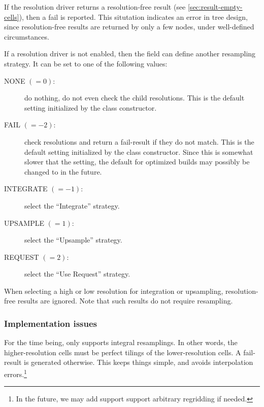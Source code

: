   If the resolution driver returns a resolution-free result (see
  \ref{sec:result-empty-cells}), then a fail is reported. This situtation
  indicates an error in tree design, since resolution-free results are returned
  by only a few nodes, under well-defined circumstances.
  
  If a resolution driver is not enabled, then the  field can
  define another resampling strategy. It can be set to one of the following
  values:

  \begin{description}

  \item[NONE $(=0)$:] do nothing, do not even check the child resolutions. This
  is the default setting initialized by the  class constructor.

  \item[FAIL $(=-2)$:] check resolutions and return a fail-result if they do
  not match. This is the default setting initialized by the  class
  constructor. Since this is somewhat slower that the  setting, the
  default for optimized builds may possibly be changed to  in the
  future.

  \item[INTEGRATE $(=-1)$:] select the ``Integrate'' strategy.

  \item[UPSAMPLE $(=1)$:] select the ``Upsample'' strategy.

  \item[REQUEST $(=2)$:] select the ``Use Request'' strategy.

  \end{description}
  
  When selecting a high or low resolution for integration or upsampling,
  resolution-free results are ignored. Note that such results do not require
  resampling.
  
\subsubsection{Implementation issues}

  For the time being,  only supports integral resamplings. In other
  words, the higher-resolution cells must be perfect tilings of the
  lower-resolution cells. A fail-result is generated otherwise. This keeps
  things simple, and avoids interpolation errors.\footnote{In the future, we
  may add support support arbitrary regridding if needed.} 

